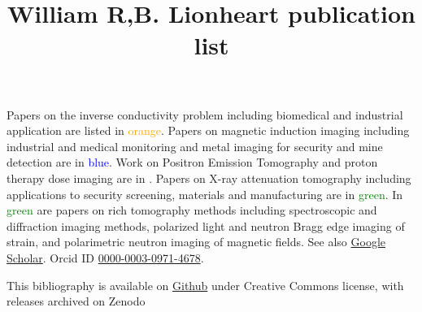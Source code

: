 \documentclass{article}
\title{William R,B. Lionheart publication list}
\begin{document}
\maketitle
Papers on the inverse conductivity problem including biomedical and industrial application are listed in \textcolor{orange}{orange}.  Papers on magnetic induction imaging including industrial and medical  monitoring and metal imaging for security and mine detection are in \textcolor{blue}{blue}.  Work on Positron Emission Tomography and proton therapy dose imaging are in \textcolor{purple}. Papers on X-ray attenuation tomography including applications to security screening, materials and manufacturing are in \textcolor{green}{green}. In \textcolor{green}{green} are papers on rich tomography methods including spectroscopic and diffraction imaging methods, polarized light and neutron Bragg edge imaging of strain, and polarimetric neutron imaging of magnetic fields. See also \href{https://scholar.google.com/citations?user=S1QF1uQAAAAJ&hl=en}{Google Scholar}. Orcid ID \href{https://orcid.org/0000-0003-0971-4678}{0000-0003-0971-4678}.

	\begin{refsection}
		\nocite{*} 
		\printbibliography[resetnumbers=true,
		title={References reverse chronological order}]   
	\end{refsection}

\small{This bibliography is available on \href{https://github.com/billlion/lionheartbibliography}{Github} under Creative Commons license, with releases archived on Zenodo}
\end{document}

